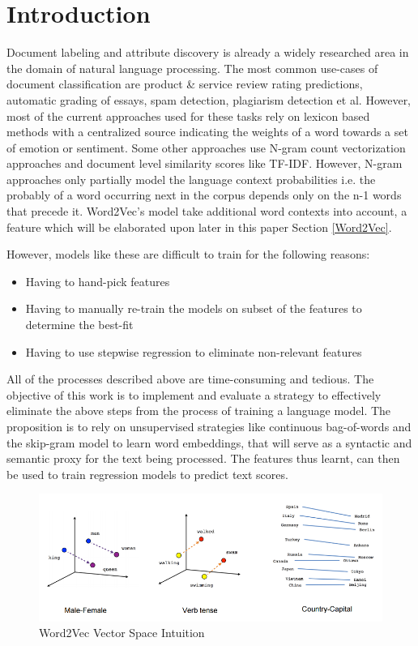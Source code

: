 \documentclass[conference]{IEEEtran}
\begin{document}
\section{Introduction}
Document labeling and attribute discovery is already a widely researched area in the domain of natural language processing.
The most common use-cases of document classification are product \& service review rating predictions, automatic grading of essays, spam detection, plagiarism detection et al.
However, most of the current approaches used for these tasks rely on lexicon based methods with a centralized source indicating the weights of a word towards a set of emotion or sentiment.
Some other approaches use N-gram count vectorization approaches and document level similarity scores like TF-IDF.
However, N-gram approaches only partially model the language context probabilities i.e. the probably of a word occurring next in the corpus depends only on the n-1 words that precede it.
Word2Vec's model take additional word contexts into account, a feature which will be elaborated upon later in this paper Section \ref{Word2Vec}.

However, models like these are difficult to train for the following reasons:
\begin{itemize}
  \item Having to hand-pick features
  \item Having to manually re-train the models on subset of the features to determine the best-fit
  \item Having to use stepwise regression to eliminate non-relevant features
\end{itemize}

All of the processes described above are time-consuming and tedious. 
The objective of this work is to implement and evaluate a strategy to effectively eliminate the above steps from the process of training a language model. 
The proposition is to rely on unsupervised strategies like continuous bag-of-words and the skip-gram model to learn word embeddings, that will serve as a syntactic and semantic proxy for the text being processed. 
The features thus learnt, can then be used to train regression models to predict text scores.


\begin{figure}[ht]
\centering
\includegraphics[width=\textwidth]{images/word2vec_1.png}
\caption{Word2Vec Vector Space Intuition\cite{tensorflow_word2vec}}
\label{fig:word2vec-vectorspace-intuition}
\end{figure}
\end{document}
